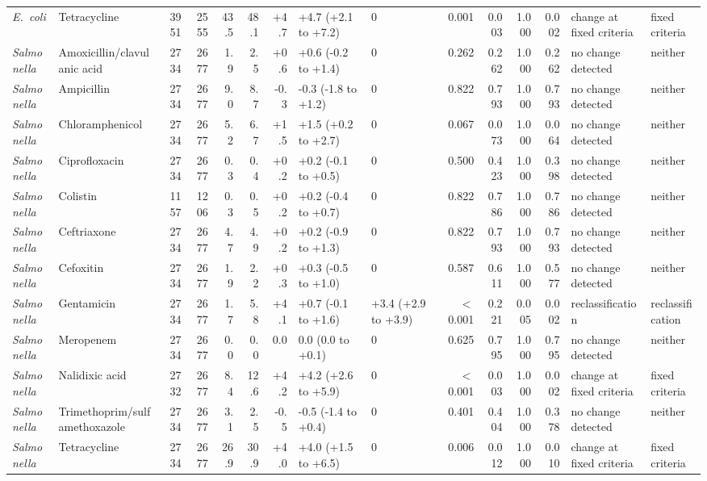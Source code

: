 \begin{table}[h]
\begin{tabular}{llrrrrrllrrrrll}
\textit{E.~coli} & Tetracycline & 3951 & 2555 & 43.5 & 48.1 & +4.7 & +4.7 (+2.1 to +7.2) & 0 & 0.001 & 0.003 & 1.000 & 0.002 & change at fixed criteria & fixed criteria \\
\textit{Salmonella} & Amoxicillin/clavulanic acid & 2734 & 2677 & 1.9 & 2.5 & +0.6 & +0.6 (-0.2 to +1.4) & 0 & 0.262 & 0.262 & 1.000 & 0.262 & no change detected & neither \\
\textit{Salmonella} & Ampicillin & 2734 & 2677 & 9.0 & 8.7 & -0.3 & -0.3 (-1.8 to +1.2) & 0 & 0.822 & 0.793 & 1.000 & 0.793 & no change detected & neither \\
\textit{Salmonella} & Chloramphenicol & 2734 & 2677 & 5.2 & 6.7 & +1.5 & +1.5 (+0.2 to +2.7) & 0 & 0.067 & 0.073 & 1.000 & 0.064 & no change detected & neither \\
\textit{Salmonella} & Ciprofloxacin & 2734 & 2677 & 0.3 & 0.4 & +0.2 & +0.2 (-0.1 to +0.5) & 0 & 0.500 & 0.423 & 1.000 & 0.398 & no change detected & neither \\
\textit{Salmonella} & Colistin & 1157 & 1206 & 0.3 & 0.5 & +0.2 & +0.2 (-0.4 to +0.7) & 0 & 0.822 & 0.786 & 1.000 & 0.786 & no change detected & neither \\
\textit{Salmonella} & Ceftriaxone & 2734 & 2677 & 4.7 & 4.9 & +0.2 & +0.2 (-0.9 to +1.3) & 0 & 0.822 & 0.793 & 1.000 & 0.793 & no change detected & neither \\
\textit{Salmonella} & Cefoxitin & 2734 & 2677 & 1.9 & 2.2 & +0.3 & +0.3 (-0.5 to +1.0) & 0 & 0.587 & 0.611 & 1.000 & 0.577 & no change detected & neither \\
\textit{Salmonella} & Gentamicin & 2734 & 2677 & 1.7 & 5.8 & +4.1 & +0.7 (-0.1 to +1.6) & +3.4 (+2.9 to +3.9) & $<$0.001 & 0.221 & 0.005 & 0.002 & reclassification & reclassification \\
\textit{Salmonella} & Meropenem & 2734 & 2677 & 0.0 & 0.0 & 0.0 & 0.0 (0.0 to +0.1) & 0 & 0.625 & 0.795 & 1.000 & 0.795 & no change detected & neither \\
\textit{Salmonella} & Nalidixic acid & 2732 & 2677 & 8.4 & 12.6 & +4.2 & +4.2 (+2.6 to +5.9) & 0 & $<$0.001 & 0.003 & 1.000 & 0.002 & change at fixed criteria & fixed criteria \\
\textit{Salmonella} & Trimethoprim/sulfamethoxazole & 2734 & 2677 & 3.1 & 2.5 & -0.5 & -0.5 (-1.4 to +0.4) & 0 & 0.401 & 0.404 & 1.000 & 0.378 & no change detected & neither \\
\textit{Salmonella} & Tetracycline & 2734 & 2677 & 26.9 & 30.9 & +4.0 & +4.0 (+1.5 to +6.5) & 0 & 0.006 & 0.012 & 1.000 & 0.010 & change at fixed criteria & fixed criteria \\

\end{tabular}
\end{table}
